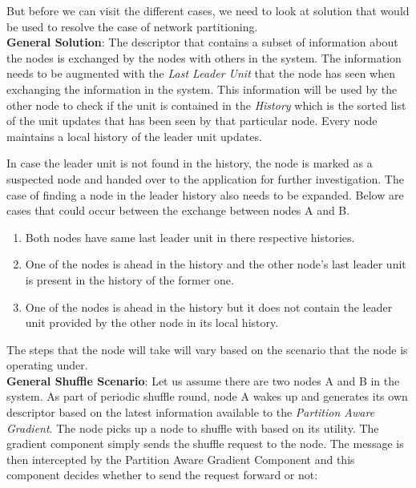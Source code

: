 \documentclass[a4paper, 11pt]{article}
\begin{document}
But before we can visit the different cases, we need to look at solution that would be used to resolve the case of network partitioning. \\

\textbf{General Solution}: The descriptor that contains a subset of information about the nodes is exchanged by the nodes with others in the system. The information needs to be augmented with the \textit{Last Leader Unit} that the node has seen when exchanging the information in the system. This information will be used by the other node to check if the unit is contained in the \textit{ History} which is the sorted list of the unit updates that has been seen by that particular node. Every node maintains a local history of the leader unit updates. 

In case the leader unit is not found in the history, the node is marked as a suspected node and handed over to the application for further investigation. The case of finding a node in the leader history also needs to be expanded. Below are cases that could occur between the exchange between nodes A and B.


\begin{enumerate}

\item Both nodes have same last leader unit in there respective histories. 

\item One of the nodes is ahead in the history and the other node's last leader unit is present in the history of the former one.

\item One of the nodes is ahead in the history but it does not contain the leader unit provided by the other node in its local history.

\end{enumerate}


The steps that the node will take will vary based on the scenario that the node is operating under.\\


\textbf{General Shuffle Scenario}: Let us assume there are two nodes A and B in the system. As part of periodic shuffle round, node A wakes up and generates its own descriptor based on the latest information available to the \textit{Partition Aware Gradient}. The node picks up a node to shuffle with based on its utility. The gradient component simply sends the shuffle request to the node. The message is then intercepted by the Partition Aware Gradient Component and this component decides whether to send the request forward or not:
\end{document}
